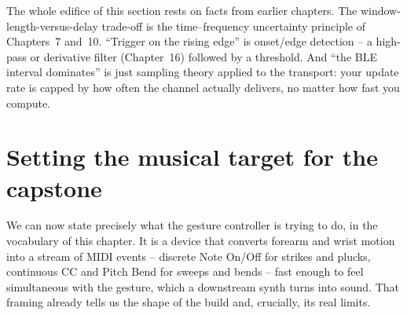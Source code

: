 \begin{connectionbox}
The whole edifice of this section rests on facts from earlier chapters. The window-length-versus-delay
trade-off is the time--frequency uncertainty principle of Chapters~7 and~10. ``Trigger on the rising
edge'' is onset/edge detection -- a high-pass or derivative filter (Chapter~16) followed by a
threshold. And ``the BLE interval dominates'' is just sampling theory applied to the transport: your
update rate is capped by how often the channel actually delivers, no matter how fast you compute.
\end{connectionbox}

\section{Setting the musical target for the capstone}
\label{ch29:target}

We can now state precisely what the gesture controller is trying to do, in the vocabulary of this
chapter. It is a device that converts forearm and wrist motion into a stream of MIDI events --
discrete Note On/Off for strikes and plucks, continuous CC and Pitch Bend for sweeps and bends -- fast
enough to feel simultaneous with the gesture, which a downstream synth turns into sound. That framing
already tells us the shape of the build and, crucially, its real limits.

